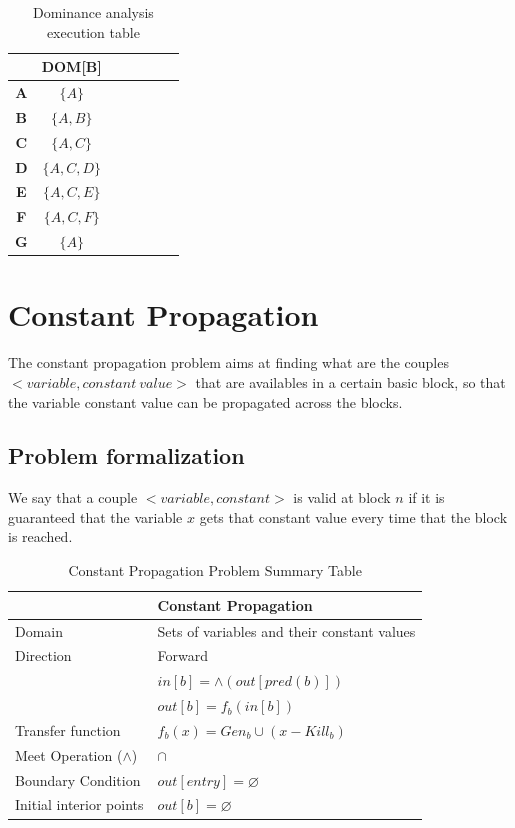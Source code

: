 \documentclass{article}
\begin{document}
\begin{table}[H]
\centering
\begin{tabular}{|c|c|c|c|c|c|c|}
\hline
   & \textbf{DOM[B]} \\ \hline
    \textbf{A} & $\{A\}$ \\ \hline
    \textbf{B} & $\{A, B\}$ \\ \hline
    \textbf{C} & $\{A, C\}$  \\ \hline
    \textbf{D} &  $\{A, C, D\}$ \\ \hline
    \textbf{E} & $\{A, C, E\}$ \\ \hline
    \textbf{F} & $\{A, C, F\}$ \\ \hline
    \textbf{G} & $\{A\}$ \\ \hline
\end{tabular}
\caption{Dominance analysis execution table}
\end{table}

\section{Constant Propagation}

The constant propagation problem aims at finding what are the couples $<variable, constant \ value>$ that are availables in a certain basic block, so that the variable constant value can be propagated across the blocks.

\subsection{Problem formalization}

We say that a couple $<variable, constant>$ is valid at block $n$ if it is guaranteed that the variable $x$ gets that constant value every time that the block is reached. 

\begin{table}[H]
\centering
\begin{tabular}{|p{}|p{}|}
\hline
 & \textbf{Constant Propagation} \\
\hline
Domain & Sets of variables and their constant values \\
\hline
Direction & Forward \\
 & $in[b] = \wedge(out[pred(b)])$ \\
 & $out[b] = f_b(in[b])$ \\
\hline
Transfer function & $f_b(x) = Gen_b \cup (x - Kill_b)$ \\
\hline
Meet Operation ($\wedge$) & $\cap$ \\
\hline
Boundary Condition & $out[entry] = \varnothing$ \\
\hline
Initial interior points & $out[b] = \varnothing$ \\
\hline
\end{tabular}
\caption{Constant Propagation Problem Summary Table}
\label{tab:dataflow_problem_x}
\end{table}
\end{document}
